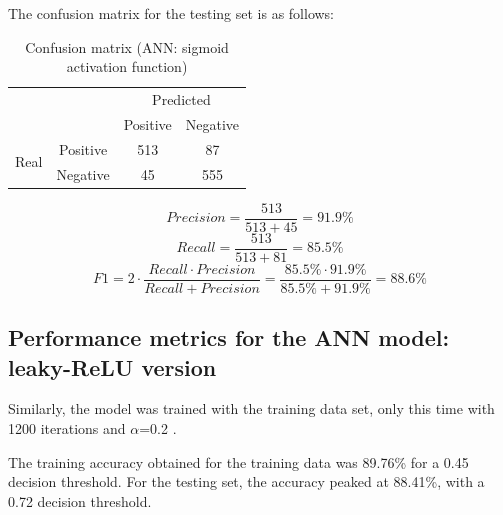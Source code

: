 \documentclass[conference]{IEEEtran}
\begin{document}
\par
The confusion matrix for the testing set is as follows: 
\begin{table}[H]
\centering
\caption{Confusion matrix (ANN: sigmoid activation function)}
\label{tab:my-table}
\begin{tabular}{cccc}
                                       &                       & \multicolumn{2}{c}{Predicted}                          \\ \cline{3-4} 
                                       & \multicolumn{1}{c|}{} & \multicolumn{1}{c|}{Positive} & \multicolumn{1}{c|}{Negative} \\ \cline{2-4} 
\multicolumn{1}{c|}{\multirow{2}{*}{Real}} & \multicolumn{1}{c|}{Positive} & \multicolumn{1}{c|}{513} & \multicolumn{1}{c|}{87} \\ \cline{2-4} 
\multicolumn{1}{c|}{}                  & \multicolumn{1}{c|}{Negative} & \multicolumn{1}{c|}{45} & \multicolumn{1}{c|}{555} \\ \cline{2-4} 
\end{tabular}
\end{table}

\begin{equation}
    Precision = \frac{513}{513+45} = 91.9\%
    \label{eq9}
\end{equation}
\begin{equation}
    Recall = \frac{513}{513+81} = 85.5\%
    \label{eq10}
\end{equation}
\begin{equation}
    F1 = 2 \cdot \frac{Recall \cdot Precision}{Recall+Precision} = \frac{85.5\% \cdot 91.9\%}{85.5\%+91.9\%} = 88.6\%
    \label{eq11}
\end{equation}

\subsection{Performance metrics for the ANN model: leaky-ReLU version}
Similarly, the model was trained with the training data set, only this time with 1200 iterations and $\alpha$=0.2 . 
\par 
The training accuracy obtained for the training data was 89.76\% for a 0.45 decision threshold. For the testing set, the accuracy peaked at 88.41\%, with a 0.72 decision threshold.
\end{document}
